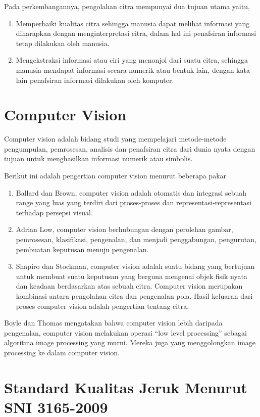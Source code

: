 \documentclass[laporan.tex]{subfiles}
\begin{document}
Pada perkembangannya,  pengolahan citra mempunyai dua tujuan utama yaitu,
\begin{enumerate}
\item Memperbaiki kualitas citra sehingga manusia dapat melihat informasi yang diharapkan dengan menginterpretasi citra, dalam hal ini penafsiran informasi tetap dilakukan oleh manusia.
\item Mengekstraksi informasi atau ciri yang menonjol dari suatu citra, sehingga manusia mendapat informasi secara numerik atau bentuk lain, dengan kata lain penafsiran informasi dilakukan oleh komputer.
\end{enumerate}

\section{Computer Vision}

Computer vision adalah bidang studi yang mempelajari metode-metode pengumpulan, pemrosesan, analisis dan penafsiran citra dari dunia nyata dengan tujuan untuk menghasilkan informasi numerik atau simbolis.

Berikut ini adalah pengertian computer vision menurut beberapa pakar

\begin{enumerate}
\item Ballard dan Brown, computer vision adalah otomatis dan integrasi sebuah range yang luas yang terdiri dari proses-proses dan representasi-representasi terhadap persepsi visual.
\item Adrian Low, computer vision berhubungan dengan perolehan gambar, pemrosesan, klasifikasi, pengenalan, dan menjadi penggabungan, pengurutan, pembuatan keputusan menuju pengenalan.
\item Shapiro dan Stockman, computer vision adalah suatu bidang yang bertujuan untuk membuat suatu keputusan yang berguna mengenai objek fisik nyata dan keadaan berdasarkan atas sebuah citra. Computer vision merupakan kombinasi antara pengolahan citra dan pengenalan pola. Hasil keluaran dari proses computer vision adalah pengertian tentang citra.
\end{enumerate}

Boyle dan Thomas mengatakan bahwa computer vision lebih daripada pengenalan, computer vision melakukan operasi “low level processing” sebagai algoritma image processing yang murni. Mereka juga yang menggolongkan image processing ke dalam computer vision.

\section{Standard Kualitas Jeruk Menurut SNI 3165-2009}
\end{document}
